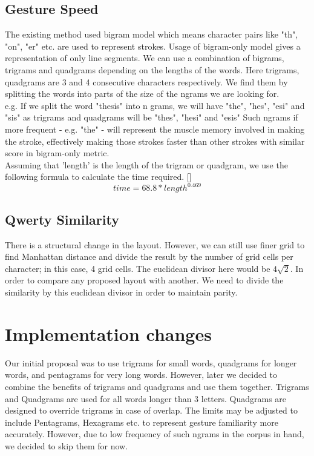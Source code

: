 \documentclass[MTech]{iitmdiss}
\begin{document}
\subsection{Gesture Speed}
The existing method used bigram model which means character pairs like "th", "on", "er" etc. are used to represent strokes. Usage of bigram-only model gives a representation of only line segments. We can use a combination of bigrams, trigrams and quadgrams depending on the lengths of the words. Here trigrams, quadgrams are 3 and 4 consecutive characters respectively. We find them by splitting the words into parts of the size of the ngrams we are looking for. \\
e.g. If we split the word "thesis" into n grams, we will have "the", "hes", "esi" and "sis" as trigrams and quadgrams will be "thes", "hesi" and "esis" Such ngrams if more frequent - e.g. "the" - will represent the muscle memory involved in making the stroke, effectively making those strokes faster than other strokes with similar score in bigram-only metric.\\

Assuming that 'length' is the length of the trigram or quadgram, we use the following formula to calculate the time required.  [\cite{strokes}] 
\begin{equation}
time = 68.8 * length^{0.469} \end{equation}

\subsection{Qwerty Similarity}
There is a structural change in the layout. However, we can still use finer grid to find Manhattan distance and divide the result by the number of grid cells per character; in this case, 4 grid cells. The euclidean divisor here would be $4 \sqrt{2}$. In order to compare any proposed layout with another. We need to divide the similarity by this euclidean divisor in order to maintain parity.

\section{Implementation changes}
Our initial proposal was to use trigrams for small words, quadgrams for longer words, and pentagrams for very long words. However, later we decided to combine the benefits of trigrams and quadgrams and use them together.
Trigrams and Quadgrams are used for all words longer than 3 letters.
Quadgrams are designed to override trigrams in case of overlap.
The limits may be adjusted to include Pentagrams, Hexagrams etc. to represent gesture familiarity more accurately. However, due to low frequency of such ngrams in the corpus in hand, we decided to skip them for now.
\end{document}
